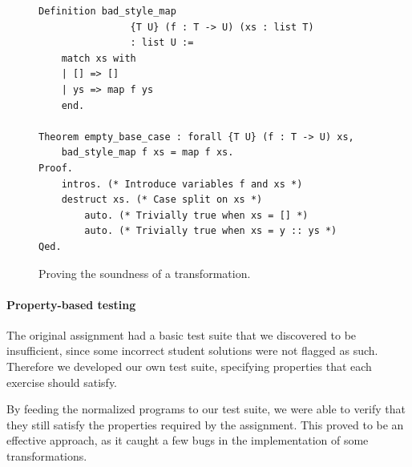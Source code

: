 \begin{figure}
\centering
\begin{verbatim}
Definition bad_style_map
                {T U} (f : T -> U) (xs : list T)
                : list U :=
    match xs with
    | [] => []
    | ys => map f ys
    end.

Theorem empty_base_case : forall {T U} (f : T -> U) xs,
    bad_style_map f xs = map f xs.
Proof.
    intros. (* Introduce variables f and xs *)
    destruct xs. (* Case split on xs *)
        auto. (* Trivially true when xs = [] *)
        auto. (* Trivially true when xs = y :: ys *)
Qed.
\end{verbatim}
\caption{Proving the soundness of a transformation.}
\label{fig:formal-proof-example}
\end{figure}

\paragraph{Property-based testing}

The original assignment had a basic test suite that we discovered to be insufficient, since some incorrect student solutions were not flagged as such. Therefore we developed our own test suite, specifying properties that each exercise should satisfy.

By feeding the normalized programs to our test suite, we were able to verify that they still satisfy the properties required by the assignment. This proved to be an effective approach, as it caught a few bugs in the implementation of some transformations.
